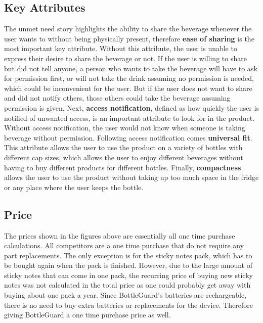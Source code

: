 \documentclass[12pt]{article}
\begin{document}
	\subsection*{Key Attributes}
	The unmet need story highlights the ability to share the beverage whenever the user wants to without being physically present, therefore \textbf{ease of sharing} is the most important key attribute. Without this attribute, the user is unable to express their desire to share the beverage or not. If the user is willing to share but did not tell anyone, a person who wants to take the beverage will have to ask for permission first, or will not take the drink assuming no permission is needed, which could be inconvenient for the user. But if the user does not want to share and did not notify others, those others could take the beverage assuming permission is given. Next, \textbf{access notification}, defined as how quickly the user  is notified of unwanted access, is an important attribute to look for in the product. Without access notification, the user would not know when someone is taking beverage without permission. Following access notification comes \textbf{universal fit}. This attribute allows the user to use the product on a variety of bottles with different cap sizes, which allows the user to enjoy different beverages without having to buy different products for different bottles. Finally, \textbf{compactness} allows the user to use the product without taking up too much space in the fridge or any place where the user keeps the bottle.
	
	\subsection*{Price}
	The prices shown in the figures above are essentially all one time purchase calculations.  All competitors are a one time purchase that do not require any part replacements. The only exception is for the sticky notes pack, which has to be bought again when the pack is finished. However, due to the large amount of sticky notes that can come in one pack, the recurring price of buying new sticky notes was not calculated in the total price as one could probably get away with buying about one pack a year. Since BottleGuard’s batteries are rechargeable, there is no need to buy extra batteries or replacements for the device. Therefore giving BottleGuard a one time purchase price as well.  
	
\end{document}
